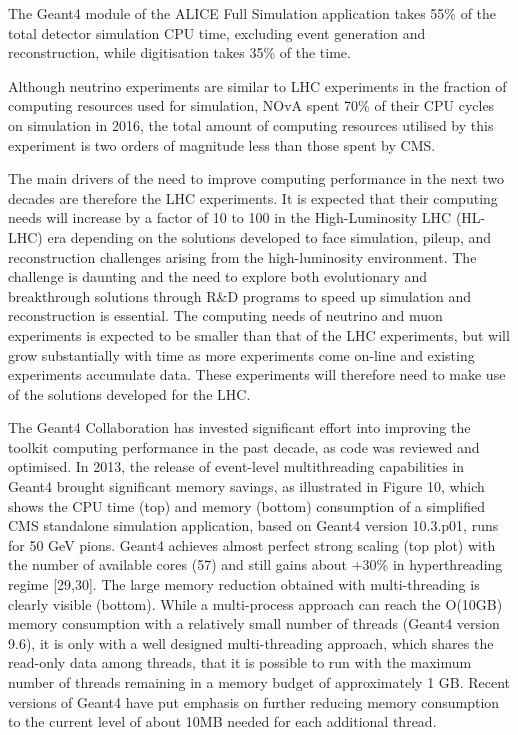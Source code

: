 \documentclass[12pt,a4paper]{article}
\begin{document}
The Geant4 module of the ALICE Full Simulation application takes 55\% of
the total detector simulation CPU time, excluding event generation and
reconstruction, while digitisation takes 35\% of the time.

Although neutrino experiments are similar to LHC experiments in the
fraction of computing resources used for simulation, NOvA spent 70\% of
their CPU cycles on simulation in 2016, the total amount of computing
resources utilised by this experiment is two orders of magnitude less
than those spent by CMS.

The main drivers of the need to improve computing performance in the
next two decades are therefore the LHC experiments. It is expected that
their computing needs will increase by a factor of 10 to 100 in the
High-Luminosity LHC (HL-LHC) era depending on the solutions developed to
face simulation, pileup, and reconstruction challenges arising from the
high-luminosity environment. The challenge is daunting and the need to
explore both evolutionary and breakthrough solutions through R\&D
programs to speed up simulation and reconstruction is essential. The
computing needs of neutrino and muon experiments is expected to be
smaller than that of the LHC experiments, but will grow substantially
with time as more experiments come on-line and existing experiments
accumulate data. These experiments will therefore need to make use of
the solutions developed for the LHC.

The Geant4 Collaboration has invested significant effort into improving
the toolkit computing performance in the past decade, as code was
reviewed and optimised. In 2013, the release of event-level
multithreading capabilities in Geant4 brought significant memory
savings, as illustrated in Figure 10, which shows the CPU time (top) and
memory (bottom) consumption of a simplified CMS standalone simulation
application, based on Geant4 version 10.3.p01, runs for 50 GeV pions.
Geant4 achieves almost perfect strong scaling (top plot) with the number
of available cores (57) and still gains about +30\% in hyperthreading
regime {[}29,30{]}. The large memory reduction obtained with
multi-threading is clearly visible (bottom). While a multi-process
approach can reach the O(10GB) memory consumption with a relatively
small number of threads (Geant4 version 9.6), it is only with a well
designed multi-threading approach, which shares the read-only data among
threads, that it is possible to run with the maximum number of threads
remaining in a memory budget of approximately 1 GB. Recent versions of
Geant4 have put emphasis on further reducing memory consumption to the
current level of about 10MB needed for each additional thread.
\end{document}
